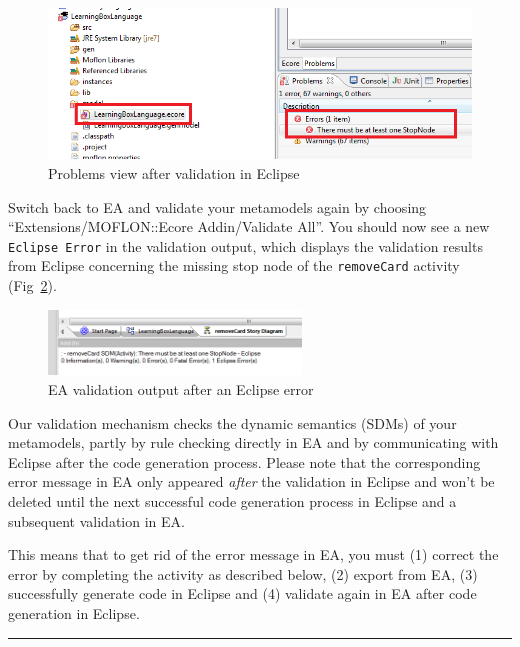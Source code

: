 \begin{figure}[htp]
\begin{center}
  \includegraphics[width=\textwidth]{pics/sdmBilder/removeCard/sdm17RAW}
  \caption{Problems view after validation in Eclipse}  
  \label{fig:eclipse_problems_view}
\end{center}
\end{figure}

Switch back to EA and validate your metamodels again by choosing ``Extensions/MOFLON::Ecore Addin/Validate All''.
You should now see a new \texttt{Eclipse Error} in the validation output, which displays the validation results from Eclipse concerning the missing stop node of the \texttt{removeCard} activity (Fig~\ref{fig:ea_eclipse_error}). 

\begin{figure}[htp]
\begin{center}
  \includegraphics[width=0.6\textwidth]{pics/sdmBilder/removeCard/sdm16RAW}
  \caption{EA validation output after an Eclipse error}  
  \label{fig:ea_eclipse_error}
\end{center}
\end{figure}

Our validation mechanism checks the dynamic semantics (SDMs) of your metamodels, partly by rule checking directly in EA and by communicating with Eclipse after the code generation process. 
Please note that the corresponding error message in EA only appeared \emph{after} the validation in Eclipse and won't be deleted until the next successful code generation process in Eclipse and a subsequent validation in EA.

This means that to get rid of the error message in EA, you must (1) correct the error by completing the activity as described below, (2) export from EA, (3) successfully generate code in Eclipse and (4) validate again in EA after code generation in Eclipse.\\
\noindent\rule[-1ex]{0.5\textwidth}{0.5pt}\\

